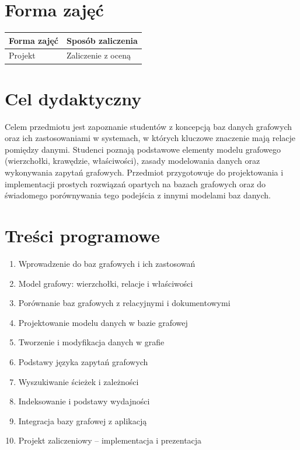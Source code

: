 \documentclass[12pt, a4paper]{article}
\begin{document}
\section{Forma zajęć}

\begin{tabular}{ll}
  \hline
  \textbf{Forma zajęć} & \textbf{Sposób zaliczenia} \\
  \hline
  Projekt & Zaliczenie z oceną \\
  \hline
\end{tabular}

\section{Cel dydaktyczny}

Celem przedmiotu jest zapoznanie studentów z koncepcją baz danych grafowych oraz ich zastosowaniami w systemach, w których kluczowe znaczenie mają relacje pomiędzy danymi. Studenci poznają podstawowe elementy modelu grafowego (wierzchołki, krawędzie, właściwości), zasady modelowania danych oraz wykonywania zapytań grafowych. Przedmiot przygotowuje do projektowania i implementacji prostych rozwiązań opartych na bazach grafowych oraz do świadomego porównywania tego podejścia z innymi modelami baz danych.

\section{Treści programowe}

\begin{enumerate}
  \item Wprowadzenie do baz grafowych i ich zastosowań
  \item Model grafowy: wierzchołki, relacje i właściwości
  \item Porównanie baz grafowych z relacyjnymi i dokumentowymi
  \item Projektowanie modelu danych w bazie grafowej
  \item Tworzenie i modyfikacja danych w grafie
  \item Podstawy języka zapytań grafowych
  \item Wyszukiwanie ścieżek i zależności
  \item Indeksowanie i podstawy wydajności
  \item Integracja bazy grafowej z aplikacją
  \item Projekt zaliczeniowy – implementacja i prezentacja
\end{enumerate}
\end{document}
